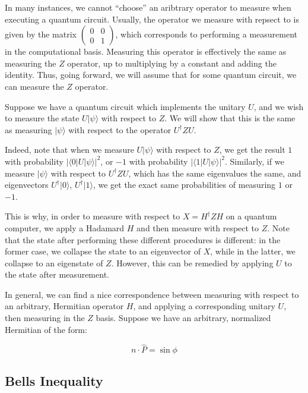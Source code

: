 \documentclass[
 10pt,
 amsmath,amssymb,
 notitlepage,
]{revtex4-1}
\begin{document}
\hrulefill

In many instances, we cannot ``choose'' an aribtrary operator to measure when executing a quantum circuit. Usually, the operator we measure with repsect to is given by the matrix $\begin{pmatrix} 0 & 0 \\ 0 & 1 \end{pmatrix}$, which
corresponds to performing a measurement in the computational basis. Measuring this operator is effectively the same as measuring the $Z$ operator, up to multiplying by a constant and adding the identity. Thus, going forward,
we will assume that for some quantum circuit, we can measure the $Z$ operator.
\newline

Suppose we have a quantum circuit which implements the unitary $U$, and we wish to measure the state $U |\psi\rangle$ with respect to $Z$. We will show that this is the same as measuring $|\psi\rangle$ with respect to the operator $U^{\dagger} Z U$.
\newline

Indeed, note that when we measure $U |\psi\rangle$ with respect to $Z$, we get the result $1$ with probability $|\langle 0 | U | \psi \rangle|^2$, or $-1$ with probability $|\langle 1 | U | \psi \rangle|^2$.
Similarly, if we measure $|\psi\rangle$ with respect to $U^{\dagger} Z U$, which has the same eigenvalues the same, and eigenvectors $U^{\dagger} |0\rangle$, $U^{\dagger} |1\rangle$, we get the exact same probabilities of measuring $1$
or $-1$.
\newline

This is why, in order to measure with respect to $X = H^{\dagger} Z H$ on a quantum computer, we apply a Hadamard $H$ and then measure with respect to $Z$. Note that the state after performing these different procedures is
different: in the former case, we collapse the state to an eigenvector of $X$, while in the latter, we collapse to an eigenstate of $Z$. However, this can be remedied by applying $U$ to the state after measurement.
\newline

In general, we can find a nice correspondence between measuring with respect to an arbitrary, Hermitian operator $H$, and applying a corresponding unitary $U$, then measuring in the $Z$ basis.
Suppose we have an arbitrary, normalized Hermitian of the form:

$$n \cdot \hat{P} = \sin \phi $$

\subsection{Bells Inequality}
\end{document}
